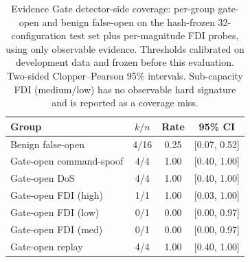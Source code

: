 \begin{table}[t]
\centering\small
\caption{Evidence Gate detector-side coverage: per-group gate-open and benign
false-open on the hash-frozen 32-configuration test set plus per-magnitude FDI
probes, using only observable evidence. Thresholds calibrated on development
data and frozen before this evaluation. Two-sided Clopper--Pearson 95\%
intervals. Sub-capacity FDI (medium/low) has no observable hard signature and
is reported as a coverage miss.}
\label{tab:gate-v3}
\begin{tabular}{lccc}
\toprule
Group & $k/n$ & Rate & 95\% CI \\
\midrule
Benign false-open & 4/16 & 0.25 & [0.07, 0.52] \\
Gate-open command-spoof & 4/4 & 1.00 & [0.40, 1.00] \\
Gate-open DoS & 4/4 & 1.00 & [0.40, 1.00] \\
Gate-open FDI (high) & 1/1 & 1.00 & [0.03, 1.00] \\
Gate-open FDI (low) & 0/1 & 0.00 & [0.00, 0.97] \\
Gate-open FDI (med) & 0/1 & 0.00 & [0.00, 0.97] \\
Gate-open replay & 4/4 & 1.00 & [0.40, 1.00] \\
\bottomrule
\end{tabular}
\end{table}
